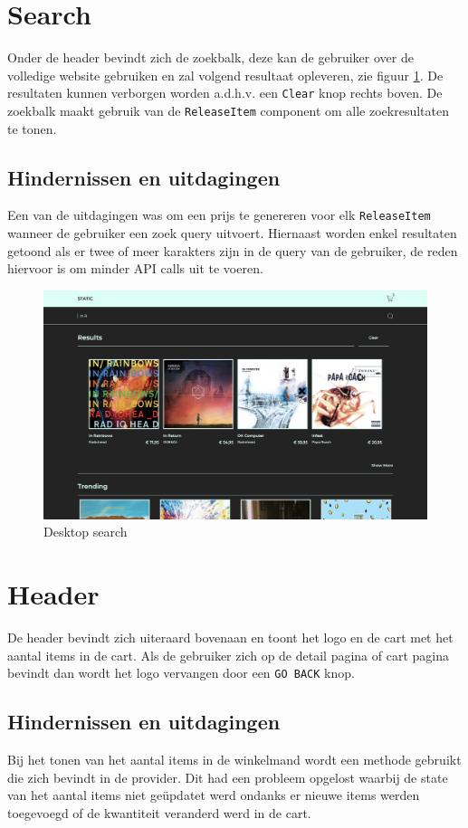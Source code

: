 \section{Search}

Onder de header bevindt zich de zoekbalk, deze kan de gebruiker over de volledige website gebruiken en zal volgend resultaat opleveren, zie figuur \ref{fig:desktopSearch}. De resultaten kunnen verborgen worden a.d.h.v. een \texttt{Clear} knop rechts boven. De zoekbalk maakt gebruik van de \texttt{ReleaseItem} component om alle zoekresultaten te tonen.

\subsection{Hindernissen en uitdagingen}

Een van de uitdagingen was om een prijs te genereren voor elk \texttt{ReleaseItem} wanneer de gebruiker een zoek query uitvoert. Hiernaast worden enkel resultaten getoond als er twee of meer karakters zijn in de query van de gebruiker, de reden hiervoor is om minder API calls uit te voeren.

\begin{figure}[h]
	\centering
	\includegraphics[width=1\linewidth]{graphics/desktopSearch}
	\caption[Desktop search]{Desktop search}
	\label{fig:desktopSearch}
\end{figure}

\section{Header}

De header bevindt zich uiteraard bovenaan en toont het logo en de cart met het aantal items in de cart. Als de gebruiker zich op de detail pagina of cart pagina bevindt dan wordt het logo vervangen door een \texttt{GO BACK} knop.

\subsection{Hindernissen en uitdagingen}

Bij het tonen van het aantal items in de winkelmand wordt een methode gebruikt die zich bevindt in de provider. Dit had een probleem opgelost waarbij de state van het aantal items niet geüpdatet werd ondanks er nieuwe items werden toegevoegd of de kwantiteit veranderd werd in de cart.